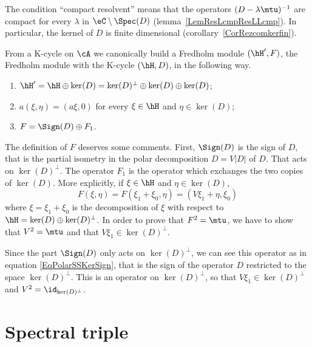 \begin{remark}
	The condition ``compact resolvent'' means that the operators $(D-\lambda\mtu)^{-1}$ are compact for every $\lambda$ in $\eC\setminus\Spec(D)$ (lemma~\ref{LemResLcmpResLLcmp}). In particular, the kernel of $D$ is finite dimensional (corollary~\ref{CorRezcomkerfin}).
\end{remark}

From a K-cycle on $\cA$ we canonically build a Fredholm module $(\hH',F)$, the Fredholm module  with the K-cycle $(\hH,D)$, in the following way.
\begin{enumerate}
	\item
		$\hH'=\hH\oplus\ker(D)=\ker(D)^{\perp}\oplus\ker(D)\oplus\ker(D)$;
	\item
		$a(\xi,\eta)=(a\xi,0)$ for every $\xi\in\hH$ and $\eta\in\ker(D)$;
	\item
		$F=\Sign(D)\oplus F_1$.
\end{enumerate}
The definition of $F$ deserves some comments. First, $\Sign(D)$ is the sign of $D$, that is the partial isometry in the polar decomposition $D=V| D |$ of $D$. That acts on $\ker(D)^{\perp}$. The operator $F_1$ is the operator which exchanges the two copies of $\ker(D)$. More explicitly, if $\xi\in\hH$ and $\eta\in\ker(D)$,
\begin{equation}
	F(\xi,\eta)=F(\xi_1+\xi_0,\eta)=(V\xi_1+\eta,\xi_0)
\end{equation}
where $\xi=\xi_1+\xi_0$ is the decomposition of $\xi$ with respect to $\hH=\ker(D)\oplus\ker(D)^{\perp}$. In order to prove that $F^2=\mtu$, we have to show that $V^2=\mtu$ and that $V\xi_1\in\ker(D)^{\perp}$.

Since the part $\Sign(D)$ only acts on $\ker(D)^{\perp}$, we can see this operator as in equation \eqref{EqPolarSSKerSign}, that is the sign of the operator $D$ restricted to the space $\ker(D)^{\perp}$. This is an operator on $\ker(D)^{\perp}$, so that $V\xi_1\in\ker(D)^{\perp}$ and $V^2=\id_{\ker(D)^{\perp}}$.

\section{Spectral triple}

